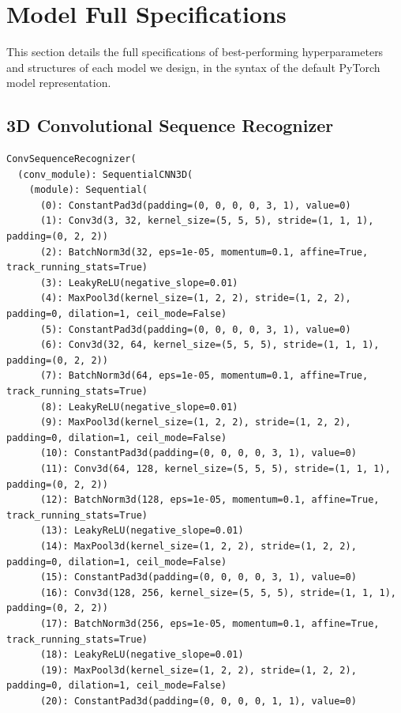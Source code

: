 \documentclass[10pt,twocolumn,letterpaper]{article}
\begin{document}
\onecolumn

\appendix
\section{Model Full Specifications}

\label{appendix:model-spec}

This section details the full specifications of best-performing hyperparameters and structures of each model we design, in the syntax of the default PyTorch model representation.

\subsection{3D Convolutional Sequence Recognizer}

{
\footnotesize
\begin{verbatim}
ConvSequenceRecognizer(
  (conv_module): SequentialCNN3D(
    (module): Sequential(
      (0): ConstantPad3d(padding=(0, 0, 0, 0, 3, 1), value=0)
      (1): Conv3d(3, 32, kernel_size=(5, 5, 5), stride=(1, 1, 1), padding=(0, 2, 2))
      (2): BatchNorm3d(32, eps=1e-05, momentum=0.1, affine=True, track_running_stats=True)
      (3): LeakyReLU(negative_slope=0.01)
      (4): MaxPool3d(kernel_size=(1, 2, 2), stride=(1, 2, 2), padding=0, dilation=1, ceil_mode=False)
      (5): ConstantPad3d(padding=(0, 0, 0, 0, 3, 1), value=0)
      (6): Conv3d(32, 64, kernel_size=(5, 5, 5), stride=(1, 1, 1), padding=(0, 2, 2))
      (7): BatchNorm3d(64, eps=1e-05, momentum=0.1, affine=True, track_running_stats=True)
      (8): LeakyReLU(negative_slope=0.01)
      (9): MaxPool3d(kernel_size=(1, 2, 2), stride=(1, 2, 2), padding=0, dilation=1, ceil_mode=False)
      (10): ConstantPad3d(padding=(0, 0, 0, 0, 3, 1), value=0)
      (11): Conv3d(64, 128, kernel_size=(5, 5, 5), stride=(1, 1, 1), padding=(0, 2, 2))
      (12): BatchNorm3d(128, eps=1e-05, momentum=0.1, affine=True, track_running_stats=True)
      (13): LeakyReLU(negative_slope=0.01)
      (14): MaxPool3d(kernel_size=(1, 2, 2), stride=(1, 2, 2), padding=0, dilation=1, ceil_mode=False)
      (15): ConstantPad3d(padding=(0, 0, 0, 0, 3, 1), value=0)
      (16): Conv3d(128, 256, kernel_size=(5, 5, 5), stride=(1, 1, 1), padding=(0, 2, 2))
      (17): BatchNorm3d(256, eps=1e-05, momentum=0.1, affine=True, track_running_stats=True)
      (18): LeakyReLU(negative_slope=0.01)
      (19): MaxPool3d(kernel_size=(1, 2, 2), stride=(1, 2, 2), padding=0, dilation=1, ceil_mode=False)
      (20): ConstantPad3d(padding=(0, 0, 0, 0, 1, 1), value=0)

\end{verbatim}}
\end{document}

